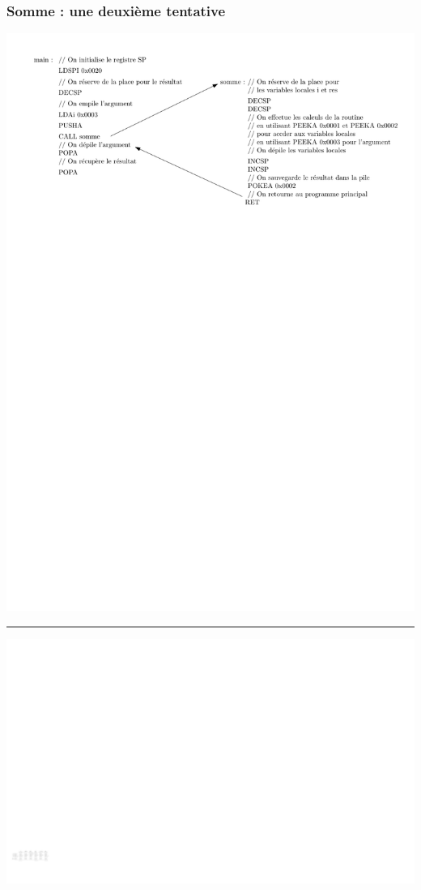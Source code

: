 \documentclass{beamer}
\begin{document}
\begin{frame}
\frametitle{Somme : une deuxième tentative}

\centering\includegraphics[width=\linewidth]{Figs/stack_args_call.pdf}
\hrule
\centering\includegraphics[width=\linewidth]{Figs/stack_args_fig.pdf}

\end{frame}
\end{document}
